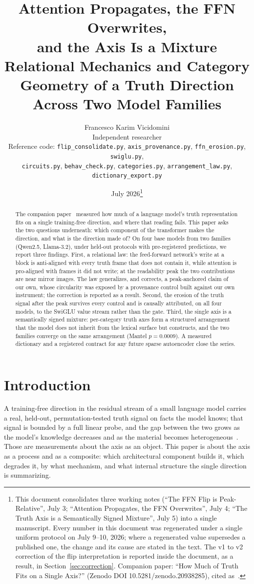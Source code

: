 \documentclass[11pt]{article}
\title{\textbf{Attention Propagates, the FFN Overwrites,\\ and the Axis Is a Mixture}\\[2pt]
\large Relational Mechanics and Category Geometry of a Truth Direction\\
Across Two Model Families}
\author{Francesco Karim Vicidomini\\
\small Independent researcher\\
\small Reference code: \texttt{flip\_consolidate.py}, \texttt{axis\_provenance.py}, \texttt{ffn\_erosion.py}, \texttt{swiglu.py},\\
\small \texttt{circuits.py}, \texttt{behav\_check.py}, \texttt{categories.py}, \texttt{arrangement\_law.py}, \texttt{dictionary\_export.py}}
\date{July 2026\thanks{This document consolidates three working notes (``The FFN
Flip is Peak-Relative'', July 3; ``Attention Propagates, the FFN Overwrites'',
July 4; ``The Truth Axis is a Semantically Signed Mixture'', July 5) into a
single manuscript. Every number in this document was regenerated under a
single uniform protocol on July 9--10, 2026; where a regenerated value
supersedes a published one, the change and its cause are stated in the text.
The v1 to v2 correction of the flip interpretation is reported inside the
document, as a result, in Section~\ref{sec:correction}. Companion paper:
``How Much of Truth Fits on a Single Axis?'' (Zenodo DOI
10.5281/zenodo.20938285), cited as~\cite{companion}.}}
\begin{document}
\maketitle

\begin{abstract}
The companion paper~\cite{companion} measured how much of a language model's
truth representation fits on a single training-free direction, and where that
reading fails. This paper asks the two questions underneath: which component
of the transformer makes the direction, and what is the direction made of? On
four base models from two families (Qwen2.5, Llama-3.2), under held-out
protocols with pre-registered predictions, we report three findings. First, a
relational law: the feed-forward network's write at a block is anti-aligned
with every truth frame that does not contain it, while attention is
pro-aligned with frames it did not write; at the readability peak the two
contributions are near mirror images. The law generalizes, and corrects, a
peak-anchored claim of our own, whose circularity was exposed by a provenance
control built against our own instrument; the correction is reported as a
result. Second, the erosion of the truth signal after the peak survives every
control and is causally attributed, on all four models, to the SwiGLU value
stream rather than the gate. Third, the single axis is a semantically signed
mixture: per-category truth axes form a structured arrangement that the model
does not inherit from the lexical surface but constructs, and the two
families converge on the same arrangement (Mantel $p = 0.0009$). A measured
dictionary and a registered contract for any future sparse autoencoder close
the series.
\end{abstract}

\section{Introduction}

A training-free direction in the residual stream of a small language model
carries a real, held-out, permutation-tested truth signal on facts the model
knows; that signal is bounded by a full linear probe, and the gap between the
two grows as the model's knowledge decreases and as the material becomes
heterogeneous~\cite{companion}. Those are measurements about the axis as an
object. This paper is about the axis as a process and as a composite: which
architectural component builds it, which degrades it, by what mechanism, and
what internal structure the single direction is summarizing.
\end{document}
